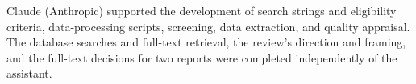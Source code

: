 Claude (Anthropic) supported the development of search strings and eligibility criteria, data-processing scripts, screening, data extraction, and quality appraisal. The database searches and full-text retrieval, the review’s direction and framing, and the full-text decisions for two reports were completed independently of the assistant.
